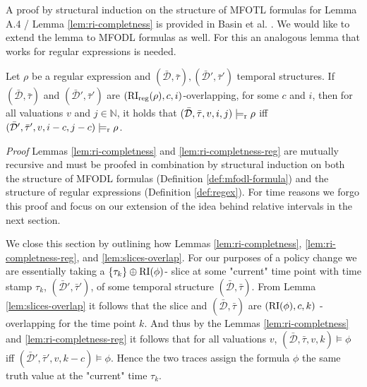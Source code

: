 A proof by structural induction on the structure of MFOTL formulas for Lemma A.4 \cite{Basin2016} / Lemma \ref{lem:ri-completness} is provided in Basin et al. \cite{Basin2016}.
We would like to extend the lemma to MFODL formulas as well.
For this an analogous lemma that works for regular expressions is needed.

\begin{lemma}
    \label{lem:ri-completness-reg}
    Let $\rho$ be a regular expression and $(\bar{\mathcal{D}}, \bar{\tau}), (\bar{\mathcal{D}}', \bar{\tau}')$ temporal structures.
    If $(\bar{\mathcal{D}}, \bar{\tau})$ and $(\bar{\mathcal{D}}', \bar{\tau}')$ are $(\operatorname{RI}_{\text{reg}}(\rho),c,i)$-overlapping, for some $c$ and $i$, then for all valuations $v$ and $j \in \mathbb{N}$, it holds that $(\bar{\mathcal{D}}, \bar{\tau},v,i,j) \models_{\text{r}} \rho$ iff $(\bar{\mathcal{D}}',\bar{\tau}',v,i-c,j-c) \models_{\text{r}} \rho$.
\end{lemma}

\textit{Proof}
Lemmas \ref{lem:ri-completness} and \ref{lem:ri-completness-reg} are mutually recursive and must be proofed in combination by structural induction on both the structure of MFODL formulas (Definition \ref{def:mfodl-formula}) and the structure of regular expressions (Definition \ref{def:regex}).
For time reasons we forgo this proof and focus on our extension of the idea behind relative intervals in the next section.

We close this section by outlining how Lemmas \ref{lem:ri-completness}, \ref{lem:ri-completness-reg}, and \ref{lem:slices-overlap}.
For our purposes of a policy change we are essentially taking a $\{\tau_k\} \oplus \operatorname{RI}(\phi)$- slice at some "current" time point with time stamp $\tau_k$, $(\bar{\mathcal{D}}', \bar{\tau}')$, of some temporal structure $(\bar{\mathcal{D}}, \bar{\tau})$.
From Lemma \ref{lem:slices-overlap} it follows that the slice and $(\bar{\mathcal{D}}, \bar{\tau})$ are $(\operatorname{RI}(\phi), c, k)$ -overlapping for the time point $k$.
And thus by the Lemmas \ref{lem:ri-completness} and \ref{lem:ri-completness-reg} it follows that for all valuations $v$, $(\bar{\mathcal{D}}, \bar{\tau}, v, k) \models \phi$ iff $(\bar{\mathcal{D}}', \bar{\tau}', v, k-c) \models \phi$.
Hence the two traces assign the formula $\phi$ the same truth value at the "current" time $\tau_k$.


